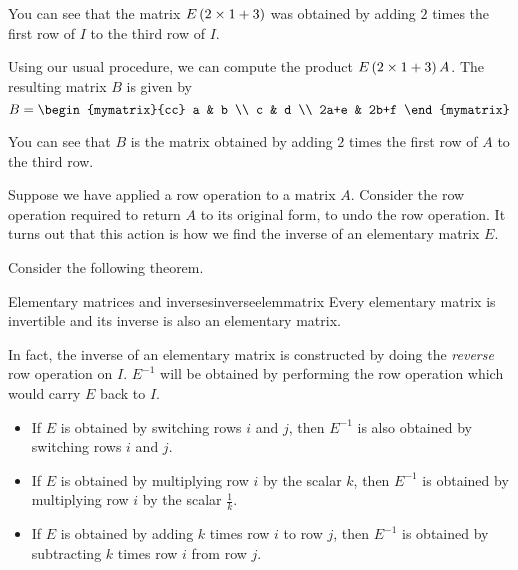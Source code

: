 \begin{solution}
You can see that the matrix $E\left(2 \times 1+3\right)$ was obtained by adding $2$ times the first row
of $I$ to the third row of $I$. 

Using our usual procedure, we can compute the product $E\left(2 \times 1+3\right)A$. The resulting 
matrix $B$ is given by 
\begin{equation*}
B = \begin{mymatrix}{cc}
a & b \\
c & d \\
2a+e & 2b+f
\end{mymatrix}
\end{equation*}

You can see that $B$ is the matrix obtained by adding $2$ times the first row of $A$ to the third row. 
\end{solution}

Suppose we have applied a row operation to a matrix $A$. Consider the row operation required to return $A$ to its original form, to undo
the row operation. It turns out that this action is how we find the inverse of an elementary matrix $E$. 

Consider the following theorem.

\begin{theorem}{Elementary matrices and inverses}{inverseelemmatrix}
Every elementary matrix is invertible and its inverse is also an elementary matrix.
\end{theorem}

In fact, the inverse of an elementary matrix is constructed by doing the {\em reverse \em}row operation on $I$. $E^{-1}$ will
be obtained by performing the row operation which would carry $E$ back to $I$. 

\begin{itemize}
\item If $E$ is obtained by switching rows $i$ and $j$, then $E^{-1}$ is also obtained by switching rows $i$ and $j$. 

\item If $E$ is obtained by multiplying row $i$ by the scalar $k$, then $E^{-1}$ is obtained by multiplying row $i$ by
the scalar $\frac{1}{k}$. 

\item If $E$ is obtained by adding $k$ times row $i$ to row $j$, then $E^{-1}$ is obtained by 
subtracting $k$ times row $i$ from row $j$.
\end{itemize} 

